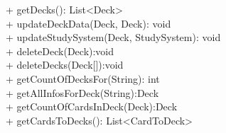 { 
    + getDecks(): List<Deck> \\ 
    + updateDeckData(Deck, Deck): void\\
    + updateStudySystem(Deck, StudySystem): void\\
    + deleteDeck(Deck):void\\
    + deleteDecks(Deck[]):void\\
    + getCountOfDecksFor(String): int\\
    + getAllInfosForDeck(String):Deck\\
    + getCountOfCardsInDeck(Deck):Deck\\
    + getCardsToDecks(): List<CardToDeck>\\
}{}